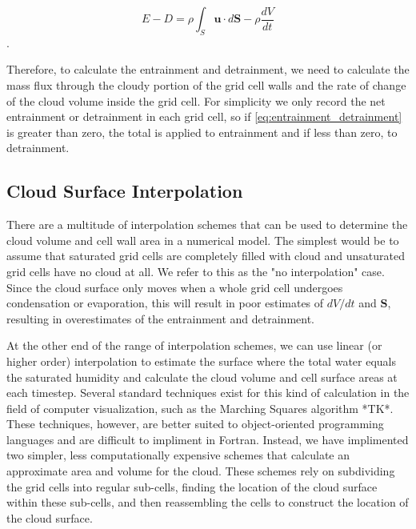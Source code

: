 \documentclass[12pt]{article}
\begin{document}
\begin{equation}
\label{eq:entrainment_detrainment} 
E - D = \rho \int_S \mathbf{u} \cdot d\mathbf{S} - \rho \frac{dV}{dt}
\end{equation}.

Therefore, to calculate the entrainment and detrainment, we need to calculate 
the mass flux through the cloudy portion of the grid cell walls and the rate of 
change of the cloud volume inside the grid cell.  For simplicity we only record 
the net entrainment or detrainment in each grid cell, so if 
\ref{eq:entrainment_detrainment} is greater than zero, the total is applied to 
entrainment and if less than zero, to detrainment.


\subsection{Cloud Surface Interpolation}

There are a multitude of interpolation schemes that can be used to determine 
the cloud volume and cell wall area in a numerical model.  The simplest would 
be to assume that saturated grid cells are completely filled with cloud and 
unsaturated grid cells have no cloud at all.  We refer to this as the "no 
interpolation" case.  Since the cloud surface only moves when a whole grid cell 
undergoes condensation or evaporation, this will result in poor estimates of 
$dV/dt$ and $\mathbf{S}$, resulting in overestimates of the entrainment and 
detrainment.

At the other end of the range of interpolation schemes, we can use linear (or 
higher order) interpolation to estimate the surface where the total water 
equals the saturated humidity and calculate the cloud volume and cell surface 
areas at each timestep.  Several standard techniques exist for this kind of 
calculation in the field of computer visualization, such as the Marching 
Squares algorithm *TK*.  These techniques, however, are better suited to 
object-oriented programming languages and are difficult to impliment in 
Fortran.  Instead, we have implimented two simpler, less computationally 
expensive schemes that calculate an approximate area and volume for the cloud.  
These schemes rely on subdividing the grid cells into regular sub-cells, 
finding the location of the cloud surface within these sub-cells, and then 
reassembling the cells to construct the location of the cloud surface.
\end{document}
